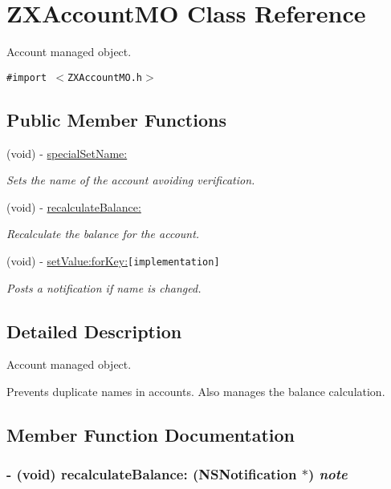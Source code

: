 \hypertarget{interface_z_x_account_m_o}{
\section{ZXAccountMO Class Reference}
\label{interface_z_x_account_m_o}
}
Account managed object.  


{\tt \#import $<$ZXAccountMO.h$>$}

\subsection*{Public Member Functions}
\begin{CompactItemize}
\item 
(void) - \hyperlink{interface_z_x_account_m_o_d69b6f022ebdda0aee4b455c0040d45f}{specialSetName:}
\begin{CompactList}\small\item\em Sets the name of the account avoiding verification. \item\end{CompactList}\item 
(void) - \hyperlink{interface_z_x_account_m_o_850cdb93b96c1f76c93836cb4a0597ce}{recalculateBalance:}
\begin{CompactList}\small\item\em Recalculate the balance for the account. \item\end{CompactList}\item 
(void) - \hyperlink{interface_z_x_account_m_o_8fe47f01576f4da7ad4212f4136ca67e}{setValue:forKey:}{\tt  \mbox{[}implementation\mbox{]}}
\begin{CompactList}\small\item\em Posts a notification if name is changed. \item\end{CompactList}\end{CompactItemize}


\subsection{Detailed Description}
Account managed object. 

Prevents duplicate names in accounts. Also manages the balance calculation. 

\subsection{Member Function Documentation}
\hypertarget{interface_z_x_account_m_o_850cdb93b96c1f76c93836cb4a0597ce}{
\subsubsection[{recalculateBalance:}]{\setlength{\rightskip}{0pt plus 5cm}- (void) recalculateBalance: (NSNotification $\ast$) {\em note}}}
\label{interface_z_x_account_m_o_850cdb93b96c1f76c93836cb4a0597ce}


